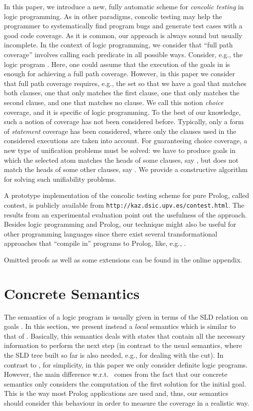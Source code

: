 \documentclass[fleqn]{tlp}
\begin{document}
In this paper, we introduce a new, fully automatic scheme for
\emph{concolic testing} in logic programming. As in other paradigms,
concolic testing may help the programmer to systematically find
program bugs and generate test cases with a good code coverage. As it
is common, our approach is always sound but usually incomplete.  In
the context of logic programming, we consider that ``full path
coverage'' involves calling each predicate in all possible
ways. Consider, e.g., the logic program . Here,
one could assume that the execution of the goals in  is
enough for achieving a full path coverage. However, in this paper we
consider that full path coverage requires, e.g., the set
 so that we have a goal that matches both
clauses, one that only matches the first clause, one that only matches
the second clause, and one that matches no clause. We call this notion
\emph{choice} coverage, and it is specific of logic programming. To
the best of our knowledge, such a notion of coverage has not been
considered before. Typically, only a form of \emph{statement} coverage
has been considered, where only the clauses used in the considered
executions are taken into account. For guaranteeing choice coverage, a
new type of unification problems must be solved:
we have to produce goals in which the selected atom  matches
the heads of some clauses, say , but does not match
the heads of some other clauses, say .
We provide a constructive algorithm for solving such unifiability
problems.

A prototype implementation of the concolic testing scheme for pure
Prolog, called \textsf{contest}, is publicly available from
\texttt{http://kaz.dsic.upv.es/contest.html}. The results from an
experimental evaluation point out the usefulness of the
approach. Besides logic programming and Prolog, our technique might
also be useful for other programming languages since there exist
several transformational approaches that ``compile in'' programs to
Prolog, like, e.g., \cite{GZAP10}.

Omitted proofs as well as some extensions can be found in the
online appendix.

\section{Concrete Semantics} \label{concrete}

The semantics of a logic program is usually given in terms of the SLD
relation on goals \cite{Llo87}. In this section, we present instead a
\emph{local} semantics which is similar to that of
. Basically, this semantics deals with states that
contain all the necessary information to perform the next step (in
contrast to the usual semantics, where the SLD tree built so far is
also needed, e.g., for dealing with the cut).
In contrast to \cite{SESGF11}, for simplicity, in this paper we only
consider definite logic programs.
However, the main difference w.r.t.\ \cite{SESGF11} comes from the
fact that our concrete semantics only considers the computation of the
first solution for the initial goal. This is the way most Prolog
applications are used and, thus, our semantics should consider this
behaviour in order to measure the coverage in a realistic way.
\end{document}
